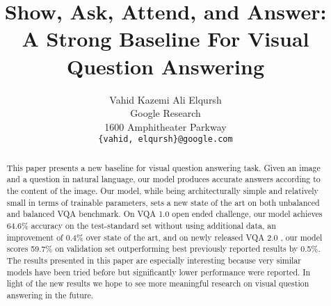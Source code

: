 \documentclass[10pt,twocolumn,letterpaper]{article}
\begin{document}
\title{Show, Ask, Attend, and Answer: \\
A Strong Baseline For Visual Question Answering}



\author{Vahid Kazemi \qquad Ali Elqursh\\
Google Research\\
1600 Amphitheater Parkway\\
{\tt\small \{vahid, elqursh\}@google.com}
}

\maketitle


\begin{abstract}
This paper presents a new baseline for visual question answering task. Given an image and a question in natural language, our model produces accurate answers according to the content of the image. Our model, while being architecturally simple and relatively small in terms of trainable parameters, sets a new state of the art on both unbalanced and balanced VQA benchmark. On VQA 1.0 \cite{Antol2015VQAVQ} open ended challenge, our model achieves 64.6\% accuracy on the test-standard set without using additional data, an improvement of 0.4\% over state of the art, and on newly released VQA 2.0 \cite{Goyal2016MakingTV}, our model scores 59.7\% on validation set outperforming best previously reported results by 0.5\%. The results presented in this paper are especially interesting because very similar models have been tried before \cite{Yang2016StackedAN} but significantly lower performance were reported. In light of the new results we hope to see more meaningful research on visual question answering in the future.
\end{abstract}
\end{document}
